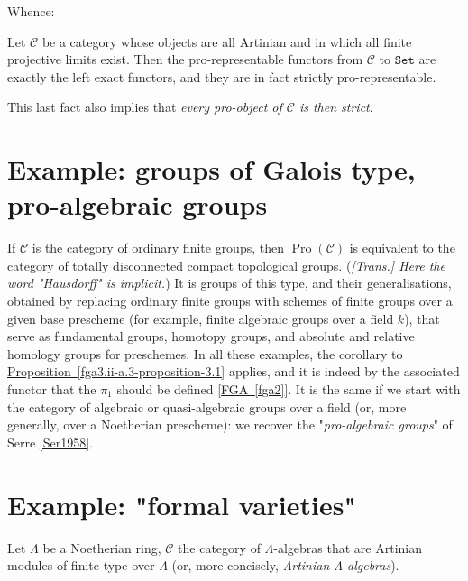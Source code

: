   Whence:\begin{corollary}{}\label{fga3.ii-a.3-proposition-3.1-corollary}\skipsinglepar\par{}Let \(\mathcal {C}\) be a category whose objects are all Artinian and in which all finite projective limits exist.
    Then the pro-representable functors from \(\mathcal {C}\) to \(\mathtt {Set}\) are exactly the left exact functors, and they are in fact strictly pro-representable.\end{corollary}\par{}This last fact also implies that \emph{every pro-object of \(\mathcal {C}\) is then strict}.\section{Example: groups of Galois type, pro-algebraic groups}\label{fga3.ii-a.4}\par{}If \(\mathcal {C}\) is the category of ordinary finite groups, then \(\operatorname {Pro}(\mathcal {C})\) is equivalent to the category of totally disconnected compact topological groups.
   (\emph{[Trans.] Here the word "Hausdorff" is implicit.})
  It is groups of this type, and their generalisations, obtained by replacing ordinary finite groups with schemes of finite groups over a given base prescheme (for example, finite algebraic groups over a field \(k\)), that serve as fundamental groups, homotopy groups, and absolute and relative homology groups for preschemes.
  In all these examples, the corollary to \hyperref[fga3.ii-a.3-proposition-3.1]{Proposition~\ref*{fga3.ii-a.3-proposition-3.1}} applies, and it is indeed by the associated functor that the \(\pi _1\) should be defined [\hyperref[fga2]{FGA~\ref*{fga2}}].
  It is the same if we start with the category of algebraic or quasi-algebraic groups over a field (or, more generally, over a Noetherian prescheme): we recover the "\emph{pro-algebraic groups}" of Serre \hyperref[Ser1958]{[Ser1958]}.\section{Example: "formal varieties"}\label{fga3.ii-a.5}\par{}Let \(\Lambda \) be a Noetherian ring, \(\mathcal {C}\) the category of \(\Lambda \)-algebras that are Artinian modules of finite type over \(\Lambda \) (or, more concisely, \emph{Artinian \(\Lambda \)-algebras}).
  

